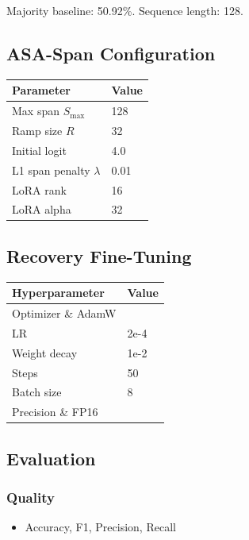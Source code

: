 Majority baseline: 50.92\%. Sequence length: 128.

\subsection{ASA-Span Configuration}

\begin{table}[H]
\centering
\small
\begin{tabular}{ll}
\toprule
\textbf{Parameter} & \textbf{Value} \\
\midrule
Max span $S_\text{max}$ & 128 \\
Ramp size $R$ & 32 \\
Initial logit & 4.0 \\
L1 span penalty $\lambda$ & 0.01 \\
LoRA rank & 16 \\
LoRA alpha & 32 \\
\bottomrule
\end{tabular}
\end{table}

\subsection{Recovery Fine-Tuning}

\begin{table}[H]
\centering
\small
\begin{tabular}{ll}
\toprule
\textbf{Hyperparameter} & \textbf{Value} \\
\midrule
Optimizer \& AdamW \\
LR & 2e-4 \\
Weight decay & 1e-2 \\
Steps & 50 \\
Batch size & 8 \\
Precision \& FP16 \\
\bottomrule
\end{tabular}
\end{table}

\subsection{Evaluation}

\subsubsection{Quality}
\begin{itemize}
\item Accuracy, F1, Precision, Recall

\end{itemize}

